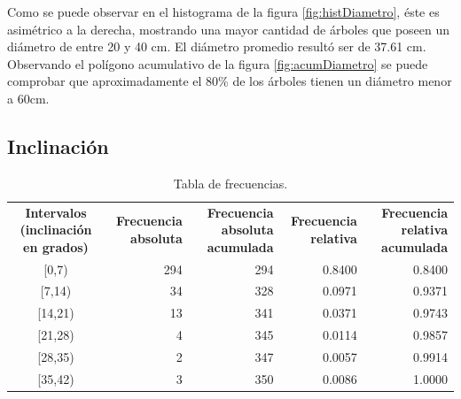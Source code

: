 \documentclass[11pt]{article}
\begin{document}
\begin{justify}
  Como se puede observar en el histograma de la figura \ref{fig:histDiametro}, 
  éste es asimétrico a la derecha, mostrando una mayor cantidad de árboles que
  poseen un diámetro de entre 20 y 40 cm. El diámetro promedio resultó ser 
  de 37.61 cm. Observando el polígono acumulativo de la figura
  \ref{fig:acumDiametro} se puede comprobar que aproximadamente el 80\%
  de los árboles tienen un diámetro menor a 60cm.
\end{justify}


\subsection{Inclinación}

\begin{table}[h!]
  \begin{center}
    \begin{tabular}{| c | r | r | r | r |}
      \hline
      \multirow{3}{3cm}{\centering\textbf{Intervalos (inclinación en grados)}} & 
      \multirow{3}{3cm}{\centering\textbf{Frecuencia absoluta}} & 
      \multirow{3}{3cm}{\centering\textbf{Frecuencia absoluta acumulada}} &
      \multirow{3}{3cm}{\centering\textbf{Frecuencia relativa}} & 
      \multirow{3}{3cm}{\centering\textbf{Frecuencia relativa acumulada}} \\
      & & & & \\
      & & & & \\ \hline
      [0,7) & 294 & 294 & 0.8400 & 0.8400 \\ \hline
      [7,14) & 34 & 328 & 0.0971 & 0.9371 \\ \hline
      [14,21) & 13 & 341 & 0.0371 & 0.9743 \\ \hline
      [21,28) & 4 & 345 & 0.0114 & 0.9857 \\ \hline
      [28,35) & 2 & 347 & 0.0057 & 0.9914 \\ \hline
      [35,42) & 3 & 350 & 0.0086 & 1.0000 \\ \hline
    \end{tabular}
    \caption{Tabla de frecuencias.}
    \label{tab:tablaInclinacion}
  \end{center}
\end{table}
\end{document}
